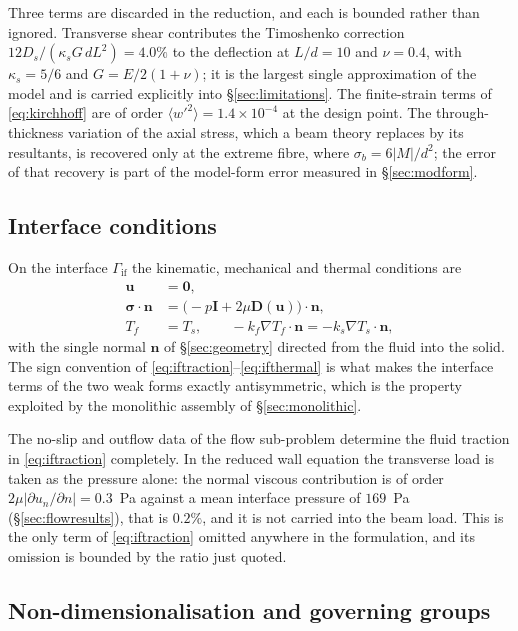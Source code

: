 \documentclass[11pt,a4paper]{article}
\newcommand{\bu}{\mathbf u}
\newcommand{\bn}{\mathbf n}
\newcommand{\bI}{\mathbf I}
\newcommand{\bsig}{\boldsymbol\sigma}
\newcommand{\Ga}{\Gamma}
\newcommand{\D}{\mathbf D}
\begin{document}
Three terms are discarded in the reduction, and each is bounded rather than ignored. Transverse
shear contributes the Timoshenko correction
$12D_s/(\kappa_sG\,dL^2)=4.0\%$ to the deflection at $L/d=10$ and $\nu=0.4$, with
$\kappa_s=5/6$ and $G=E/2(1+\nu)$; it is the largest single approximation of the model and is
carried explicitly into \S\ref{sec:limitations}. The finite-strain terms of \eqref{eq:kirchhoff}
are of order $\langle w'^2\rangle=1.4\times10^{-4}$ at the design point. The through-thickness
variation of the axial stress, which a beam theory replaces by its resultants, is recovered
only at the extreme fibre, where $\sigma_b=6|M|/d^2$; the error of that recovery is part of
the model-form error measured in \S\ref{sec:modform}.

\subsection{Interface conditions}
\label{sec:ifconditions}

On the interface $\Ga_{\mathrm{if}}$ the kinematic, mechanical and thermal
conditions are
\begin{align}
\bu &= \mathbf 0, \label{eq:ifkin}\\
\bsig\cdot\bn &= \bigl(-p\bI+2\mu\D(\bu)\bigr)\cdot\bn,
\label{eq:iftraction}\\
T_f &= T_s, \qquad -k_f\nabla T_f\cdot\bn = -k_s\nabla T_s\cdot\bn,
\label{eq:ifthermal}
\end{align}
with the single normal $\bn$ of \S\ref{sec:geometry} directed from the fluid
into the solid. The sign convention of \eqref{eq:iftraction}--\eqref{eq:ifthermal}
is what makes the interface terms of the two weak forms exactly antisymmetric,
which is the property exploited by the monolithic assembly of
\S\ref{sec:monolithic}.

The no-slip and outflow data of the flow sub-problem determine the fluid
traction in \eqref{eq:iftraction} completely. In the reduced wall equation the
transverse load is taken as the pressure alone: the normal viscous
contribution is of order $2\mu|\partial u_n/\partial n|=0.3$~Pa against a mean
interface pressure of $169$~Pa (\S\ref{sec:flowresults}), that is $0.2\%$,
and it is not carried into the beam load. This is the only term of
\eqref{eq:iftraction} omitted anywhere in the formulation, and its omission is
bounded by the ratio just quoted.

\subsection{Non-dimensionalisation and governing groups}
\label{sec:groups}
\end{document}
